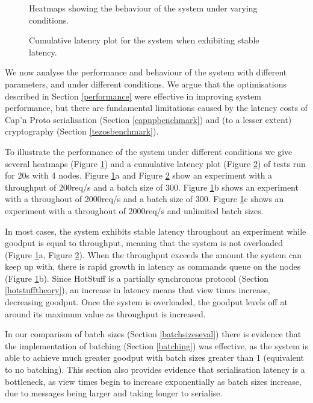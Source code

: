 \begin{figure}[h!]
\centering
\resizebox{.8\textwidth}{!}{}
\caption{Heatmaps showing the behaviour of the system under varying conditions.}
\label{heatmaps}
\end{figure}

\begin{figure}[h!]
\centering
\resizebox{.6\textwidth}{!}{}
\caption{Cumulative latency plot for the system when exhibiting stable latency.}
\label{ecdfstable}
\end{figure}

We now analyse the performance and behaviour of the system with different parameters, and under different conditions. We argue that the optimisations described in Section \ref{performance} were effective in improving system performance, but there are fundamental limitations caused by the latency costs of Cap'n Proto serialisation (Section \ref{capnpbenchmark}) and (to a lesser extent) cryptography (Section \ref{tezosbenchmark}).

To illustrate the performance of the system under different conditions we give several heatmaps (Figure \ref{heatmaps}) and a cumulative latency plot (Figure \ref{ecdfstable}) of tests run for 20s with 4 nodes. Figure \ref{heatmaps}a and Figure \ref{ecdfstable} show an experiment with a throughput of 200req/s and a batch size of 300. Figure \ref{heatmaps}b shows an experiment with a throughout of 2000req/s and a batch size of 300. Figure \ref{heatmaps}c shows an experiment with a throughout of 2000req/s and unlimited batch sizes.

In most cases, the system exhibits stable latency throughout an experiment while goodput is equal to throughput, meaning that the system is not overloaded (Figure \ref{heatmaps}a, Figure \ref{ecdfstable}). When the throughput exceeds the amount the system can keep up with, there is rapid growth in latency as commands queue on the nodes (Figure \ref{heatmaps}b). Since HotStuff is a partially synchronous protocol (Section \ref{hotstufftheory}), an increase in latency means that view times increase, decreasing goodput. Once the system is overloaded, the goodput levels off at around its maximum value as throughput is increased.

In our comparison of batch sizes (Section \ref{batchsizeseval}) there is evidence that the implementation of batching (Section \ref{batching}) was effective, as the system is able to achieve much greater goodput with batch sizes greater than 1 (equivalent to no batching). This section also provides evidence that serialisation latency is a bottleneck, as view times begin to increase exponentially as batch sizes increase, due to messages being larger and taking longer to serialise.

